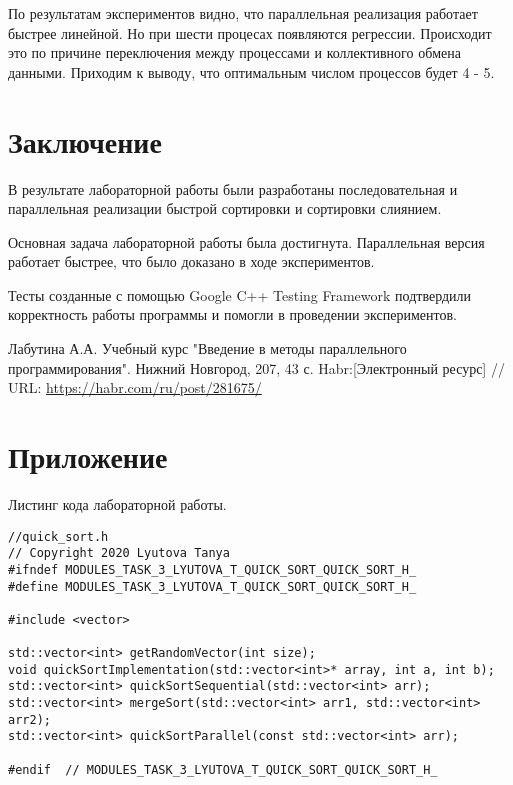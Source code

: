 \documentclass{report}
\begin{document}
\par По результатам экспериментов видно, что параллельная реализация работает быстрее линейной. Но при шести процесах появляются регрессии. Происходит это по причине переключения между процессами и коллективного обмена данными. Приходим к выводу, что оптимальным числом процессов будет 4 - 5.
\newpage

\section*{Заключение}
В результате лабораторной работы были разработаны последовательная и параллельная реализации быстрой сортировки и сортировки слиянием.
\par Основная задача лабораторной работы была достигнута. Параллельная версия работает быстрее, что было доказано в ходе экспериментов.
\par Тесты созданные с помощью Google C++ Testing Framework подтвердили корректность работы программы и помогли в проведении экспериментов.
\newpage

\begin{thebibliography}{1}
 Лабутина А.А. Учебный курс "Введение в методы параллельного программирования". Нижний Новгород, 207, 43 с. 
 Habr:[Электронный ресурс] // URL: \url {https://habr.com/ru/post/281675/}
\end{thebibliography}
\newpage

\section*{Приложение}
Листинг кода лабораторной работы.
\begin{lstlisting}
//quick_sort.h
// Copyright 2020 Lyutova Tanya
#ifndef MODULES_TASK_3_LYUTOVA_T_QUICK_SORT_QUICK_SORT_H_
#define MODULES_TASK_3_LYUTOVA_T_QUICK_SORT_QUICK_SORT_H_

#include <vector>

std::vector<int> getRandomVector(int size);
void quickSortImplementation(std::vector<int>* array, int a, int b);
std::vector<int> quickSortSequential(std::vector<int> arr);
std::vector<int> mergeSort(std::vector<int> arr1, std::vector<int> arr2);
std::vector<int> quickSortParallel(const std::vector<int> arr);

#endif  // MODULES_TASK_3_LYUTOVA_T_QUICK_SORT_QUICK_SORT_H_
\end{lstlisting}
\end{document}
